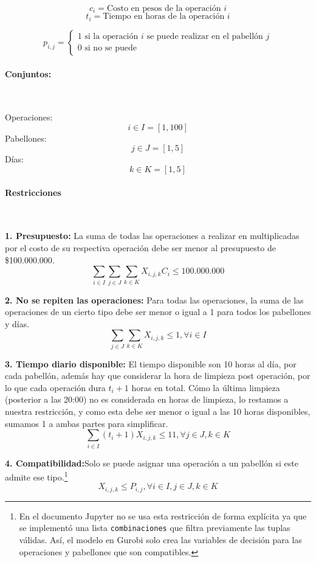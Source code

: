 \documentclass[a4paper,12pt]{book}
\begin{document}
 	$$c_i = \text{Costo en pesos de la operación } i $$
 	$$t_i = \text{Tiempo en horas de la operación } i $$
 	
 	$$p_{i,j}= \begin{cases}
 		1 \text{ si la operación $i$ se puede realizar en el pabellón $j$} \\
 		0 \text{ si no se puede}
 	\end{cases}
 		$$
 		
 
 	\paragraph{Conjuntos:}\textcolor{white}{newline}
 	
	Operaciones: 
 	$$i \in I = [1,100]$$
 	Pabellones:
 	$$j \in J = [1,5]$$
 	Días:
 	$$k \in K = [1,5]$$
 	
 	\paragraph{Restricciones}\textcolor{white}{newline}
 	
 	\textbf{1. Presupuesto:} La suma de todas las operaciones a realizar en multiplicadas por el costo de su respectiva operación debe ser menor al presupuesto de \$100.000.000.
 	$$\sum_{i\in I} \sum_{j \in J} \sum_{k \in K} X_{i,j,k} C_i \leq 100.000.000$$
 	
 	\textbf{2. No se repiten las operaciones: }Para todas las operaciones, la suma de las operaciones de un cierto tipo debe ser menor o igual a 1 para todos los pabellones y días.
 	$$\sum_{j \in J} \sum_{k \in K} X_{i,j,k} \leq 1, \forall i \in I$$
 	
 	\textbf{3. Tiempo diario disponible: }El tiempo disponible son 10 horas al día, por cada pabellón, además hay que considerar la hora de limpieza post operación, por lo que cada operación dura $t_i + 1$ horas en total. Cómo la última limpieza (posterior a las 20:00) no es considerada en horas de limpieza, lo restamos a nuestra restricción, y como esta debe ser menor o igual a las 10 horas disponibles, sumamos 1 a ambas partes para simplificar.
 	$$\sum_{i \in I} (t_i + 1)X_{i,j,k} \leq 11, \forall j \in J, k \in K$$
 	
 	\textbf{4. Compatibilidad:}Solo se puede asignar una operación a un pabellón si este admite ese tipo.\footnote{En el documento Jupyter no se usa esta restricción de forma explícita ya que se implementó una lista \texttt{combinaciones} que filtra previamente las tuplas válidas. Así, el modelo en Gurobi solo crea las variables de decisión para las operaciones y pabellones que son compatibles.}
 	$$X_{i,j,k} \leq P_{i,j}, \forall i \in I, j \in J, k \in K$$
 	
\end{document}
